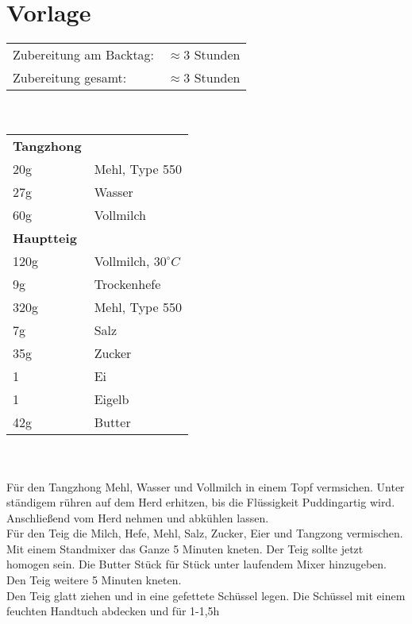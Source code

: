 \section{Vorlage}
\begin{tabular}{ll}
    Zubereitung am Backtag: & $\approx$3 Stunden \\
    Zubereitung gesamt:     & $\approx$3 Stunden
\end{tabular}\\\paragraph*{}
\begin{tabular}{ll}
    \textbf{Tangzhong} \\
    20g  & Mehl, Type 550          \\
    27g  & Wasser                  \\
    60g  & Vollmilch               \\
    \textbf{Hauptteig} \\
    120g & Vollmilch, $30^\circ C$ \\
    9g   & Trockenhefe             \\
    320g & Mehl, Type 550          \\
    7g   & Salz                    \\
    35g  & Zucker                  \\
    1    & Ei                      \\
    1    & Eigelb                  \\
    42g  & Butter                  \\
\end{tabular}\\\paragraph*{}
Für den Tangzhong Mehl, Wasser und Vollmilch in einem Topf
vermsichen. Unter ständigem rühren auf dem Herd erhitzen, bis
die Flüssigkeit Puddingartig wird. Anschließend vom Herd nehmen
und abkühlen lassen.\\
Für den Teig die Milch, Hefe, Mehl, Salz, Zucker, Eier und Tangzong
vermischen. Mit einem Standmixer das Ganze 5 Minuten
kneten. Der Teig sollte jetzt homogen sein. Die Butter Stück für
Stück unter laufendem Mixer hinzugeben. Den Teig weitere 5 Minuten
kneten.\\
Den Teig glatt ziehen und in eine gefettete Schüssel legen. Die
Schüssel mit einem feuchten Handtuch abdecken und für 1-1,5h
